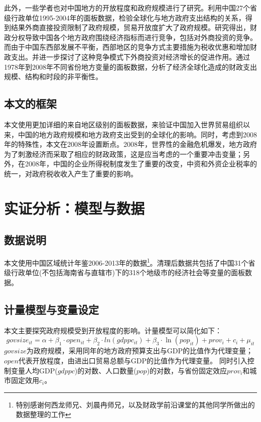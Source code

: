 \documentclass[10pt]{article}
\begin{document}
此外，一些学者也对中国地方的开放程度和政府规模进行了研究。\cite{cai2008}利用中国27个省级行政单位1995-2004年的面板数据，检验全球化与地方政府支出结构的关系，得到结果外商直接投资限制了政府规模，贸易开放度扩大了政府规模。\cite{wang2007}研究得出，财政分权导致中国各个地方政府围绕经济指标而进行竞争，包括对外商投资的竞争。而由于中国东西部发展不平衡，西部地区的竞争方式主要措施为税收优惠和增加财政支出。并进一步探讨了这种竞争模式下外商投资对经济增长的促进作用。\cite{sheng2010}通过1978年到2008年不同省份地方变量的面板数据，分析了经济全球化造成的财政支出规模、结构和时段的非平衡性。
\subsection{本文的框架}
本文使用更加详细的来自地区级别的面板数据，来验证中国加入世界贸易组织以来，中国的地方政府规模和地方政府支出受到的全球化的影响。同时，考虑到2008年的特殊性，本文在2008年设置断点。2008年，世界性的金融危机爆发，地方政府为了刺激经济而采取了相应的财政政策，这是应当考虑的一个重要冲击变量；另外，在2008年，中国的企业所得税制度发生了重要的改变，中资和外资企业税率的统一，对政府税收收入产生了重要的影响。

\section{实证分析：模型与数据}
\subsection{数据说明}
本文使用中国区域统计年鉴2006-2013年的数据\footnote{特别感谢何西龙师兄、刘晨冉师兄，以及财政学前沿课堂的其他同学所做出的数据整理的工作}。清理后数据共包括了中国31个省级行政单位(不包括海南省与直辖市)下的318个地级市的经济社会等变量的面板数据。
\subsection{计量模型与变量设定}
本文主要探究政府规模受到开放程度的影响。计量模型可以简化如下：
$$ govsize_{it} = \alpha + \beta_1 \cdot open_{it} + \beta_2 \cdot ln(gdppc_{it}) + \beta_3 \cdot \ln(pop_{it}) + prov_{i} +c_i + \mu_{it}$$
$govsize$为政府规模，采用同年的地方政府预算支出与GDP的比值作为代理变量；$open$代表开放程度，由进出口贸易总额与GDP的比值作为代理变量。
同时引入控制变量人均GDP($gdppc$)的对数、人口数量($pop$)的对数，与省份固定效应$prov_i$和城市固定效用$c_i$。
\end{document}
